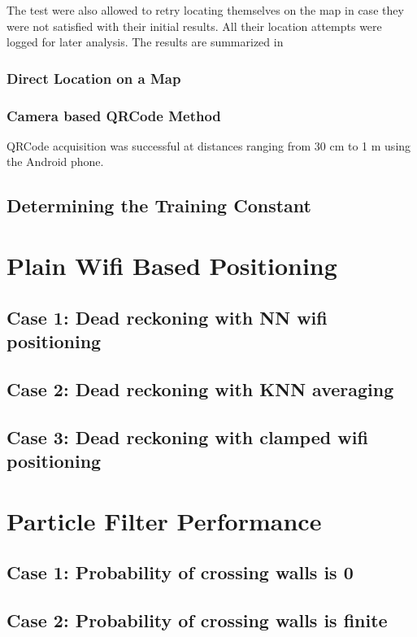 The test were also allowed to retry locating themselves on the map in case they
were not satisfied with their initial results. All their location attempts were
logged for later analysis. The results are summarized in 

\subsubsection{Direct Location on a Map}

\subsubsection{Camera based QRCode Method}
QRCode acquisition was successful at distances ranging from 30 cm to 1 m using
the Android phone. 

\subsection{Determining the Training Constant}

\section{Plain Wifi Based Positioning}
\subsection{Case 1: Dead reckoning with NN wifi positioning}
\subsection{Case 2: Dead reckoning with KNN averaging}
\subsection{Case 3: Dead reckoning with clamped wifi positioning}

\section{Particle Filter Performance}
\subsection{Case 1: Probability of crossing walls is 0}
\subsection{Case 2: Probability of crossing walls is finite}
